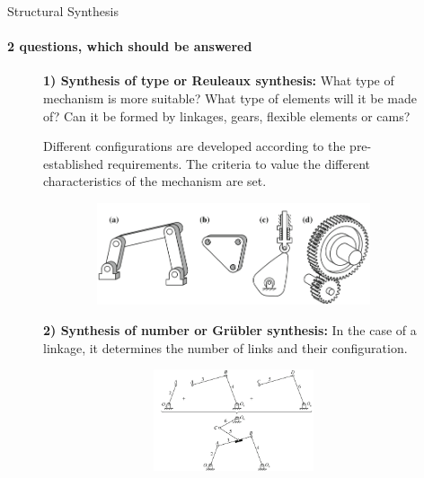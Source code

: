 \documentclass[aspectratio=169]{beamer}
\begin{document}
\begin{frame}[t]{Structural Synthesis}
    \framesubtitle{2 questions, which should be answered}
    \vspace{-0.6cm}
    \begin{figure}[H]
        \begin{minipage}{0.50\textwidth}
            \footnotesize
            \textbf{1) Synthesis of type or Reuleaux synthesis:} What type of mechanism is more suitable? What type of elements will it be made of? Can it be formed by linkages, gears, ﬂexible elements or cams?
            
            Different conﬁgurations are developed according to the pre-established requirements. The criteria to value the different characteristics of the mechanism are set.
            \label{reuleaux_synthesis.png}
        \end{minipage}\hfill
        \begin{minipage}{0.48\textwidth}
            \centering\includegraphics[height=3cm,width=1\textwidth,keepaspectratio]{reuleaux_synthesis.png}
        \end{minipage}
    \end{figure}
    \vspace{-0.6cm}
    
    \begin{figure}[H]
        \begin{minipage}{0.50\textwidth}
            \footnotesize
            \textbf{2) Synthesis of number or Grübler synthesis:} In the case of a linkage, it determines the number of links and their conﬁguration. 
            \label{grubler_synthesis.png}
        \end{minipage}\hfill
        \begin{minipage}{0.48\textwidth}
            \centering\includegraphics[height=3cm,width=1\textwidth,keepaspectratio]{grubler_synthesis.png}
        \end{minipage}
    \end{figure}
    \end{frame}
\end{document}
